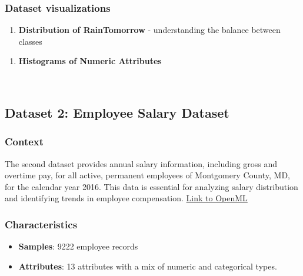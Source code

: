 \documentclass[11pt]{article}
\providecommand{\tightlist}{%
      \setlength{\itemsep}{0pt}\setlength{\parskip}{0pt}}
\begin{document}
    

    \subsubsection{Dataset visualizations}\label{dataset-visualizations}

\begin{enumerate}
\def\labelenumi{\arabic{enumi}.}
\tightlist
\item
  \textbf{Distribution of RainTomorrow} - understanding the balance
  between classes
\end{enumerate}

    \begin{enumerate}
\def\labelenumi{\arabic{enumi}.}
\setcounter{enumi}{1}
\tightlist
\item
  \textbf{Histograms of Numeric Attributes}
\end{enumerate}

    \begin{center}
    \end{center}
    { \hspace*{\fill} \\}
    
    \subsection{Dataset 2: Employee Salary
Dataset}\label{dataset-2-employee-salary-dataset}
\raggedright
\subsubsection{Context}\label{context}

The second dataset provides annual salary information, including gross
and overtime pay, for all active, permanent employees of Montgomery
County, MD, for the calendar year 2016. This data is essential for
analyzing salary distribution and identifying trends in employee
compensation.
\href{https://www.openml.org/search?type=data&id=42125&sort=runs&status=active}{Link
to OpenML}

\subsubsection{Characteristics}\label{characteristics}

\begin{itemize}
\tightlist
\item
  \textbf{Samples}: 9222 employee records
\item
  \textbf{Attributes}: 13 attributes with a mix of numeric and
  categorical types.
\end{itemize}
\end{document}
